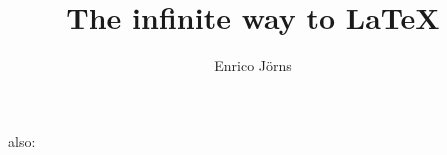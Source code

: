 \documentclass[a4paper,portrait]{scrreprt}
\makeatletter
\renewcommand{\maketitle}{%
\setlength{\fboxsep}{0cm}%
\hspace*{-\tubspage@borderwidth}%
\ifthenelse{\boolean{tubspage@marginleft}}{%
  \hspace*{-\marginparwidth}%
  \hspace*{-\marginparsep}%
}{}%
\raisebox{\tubspage@borderwidth}[0cm]{%
\colorbox{tuSecondaryLight}{%
  \begin{minipage}[t][\textheight+2\tubspage@borderwidth]{%
    \paperwidth-2\tubspage@borderwidth}%
      \LARGE asdf dfg sdfg dsfg dsf
  \end{minipage}%
}}%
\vspace*{-0.75\tubslogoHeight}\vspace{-\textheight}\vspace*{-2\tubspage@borderwidth}\\%
\hspace*{-2\tubspage@borderwidth}%
\ifthenelse{\boolean{tubspage@marginleft}}{%
  \hspace*{-\marginparwidth}%
  \hspace*{-\marginparsep}%
}{}%
\colorbox{tuRed}{%
\hbox to \tubslogoWidth{\vbox to \tubslogoHeight{\tubslogo}}%
}\vspace*{-0.25\tubslogoHeight}%
}
\newcommand\BackgroundPic{%
\put(\LenToUnit{\tubspage@borderwidth},\LenToUnit{\tubspage@borderwidth}){%
\colorbox{tuGreenLight40}{\parbox[b][\paperheight-\tubspage@senderheight-\tubspage@borderwidth]{%
  \paperwidth-2\tubspage@borderwidth}{%
~
}}}}
\makeatother
\begin{document}


\author{Enrico Jörns}
\title{The infinite way to LaTeX}

\makeatletter
{}
~also: 
\thetest
\makeatother

\newpage

\begin{tubsbox}[tuBlue100]{0}{1}{6}{2}
~
\end{tubsbox}
\begin{tubsbox}[tuBlue80]{0}{3}{6}{2}
~
\end{tubsbox}
\begin{tubsbox}[tuBlue60]{0}{5}{6}{1}
~
\end{tubsbox}
\begin{tubsbox}[tuBlue40]{0}{6}{6}{3}
~
\end{tubsbox}
~
\newpage



\end{document}
